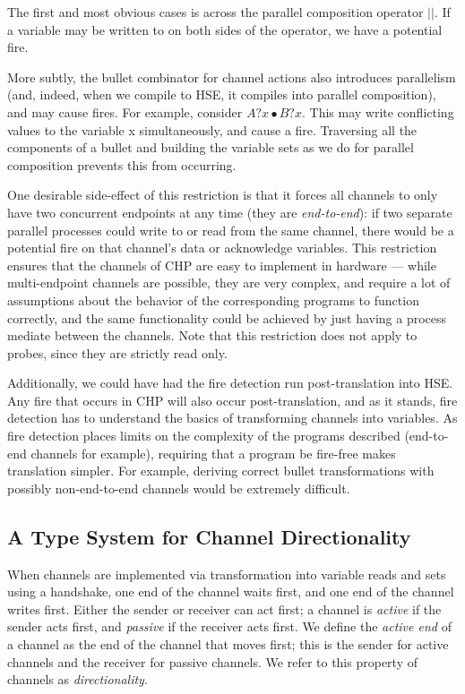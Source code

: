 \documentclass[times, 10pt]{article}
\begin{document}
The first and most obvious cases is across the parallel composition operator
$||$.  If a variable may be written to on both sides of the operator, we have a
potential fire.

More subtly, the bullet combinator for channel actions also introduces
parallelism (and, indeed, when we compile to HSE, it compiles into parallel
composition), and may cause fires.  For example, consider $A?x \bullet B?x$.
This may write conflicting values to the variable x simultaneously, and cause a
fire.  Traversing all the components of a bullet and building the variable sets
as we do for parallel composition prevents this from occurring.

One desirable side-effect of this restriction is that it forces all channels to
only have two concurrent endpoints at any time (they are \emph{end-to-end}):  if
two separate parallel processes could write to or read from the same channel,
there would be a potential fire on that channel's data or acknowledge variables.
This restriction ensures that the channels of CHP are easy to implement in
hardware --- while multi-endpoint channels are possible, they are very complex,
and require a lot of assumptions about the behavior of the corresponding
programs to function correctly, and the same functionality could be achieved by
just having a process mediate between the channels.  Note that this restriction
does not apply to probes, since they are strictly read only.

Additionally, we could have had the fire detection run post-translation into
HSE.  Any fire that occurs in CHP will also occur post-translation, and as it
stands, fire detection has to understand the basics of transforming channels
into variables. As fire detection places limits on the complexity of the
programs described (end-to-end channels for example), requiring that a program
be fire-free makes translation simpler.  For example, deriving correct bullet
transformations with possibly non-end-to-end channels would be extremely
difficult.

\subsection{A Type System for Channel Directionality}

When channels are implemented via transformation into variable reads and sets
using a handshake, one end of the channel waits first, and one end of the
channel writes first.  Either the sender or receiver can act first; a channel is
\emph{active} if the sender acts first, and \emph{passive} if the receiver acts
first.  We define the \emph{active end} of a channel as the end of the channel
that moves first; this is the sender for active channels and the receiver for
passive channels. We refer to this property of channels as \emph{directionality}.
\end{document}
